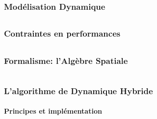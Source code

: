 \documentclass[11pt]{beamer}
\begin{document}
\section{Modélisation Dynamique}

\begin{frame}
  \frametitle{}
  \framesubtitle{}
\end{frame}


\section{Contraintes en performances}

\begin{frame}
  \frametitle{}
  \framesubtitle{}
\end{frame}


\section{Formalisme: l'Algèbre Spatiale}

\begin{frame}
  \frametitle{}
  \framesubtitle{}
\end{frame}


\part{}
\section{L'algorithme de Dynamique Hybride}

\subsection{Principes et implémentation}
\end{document}
